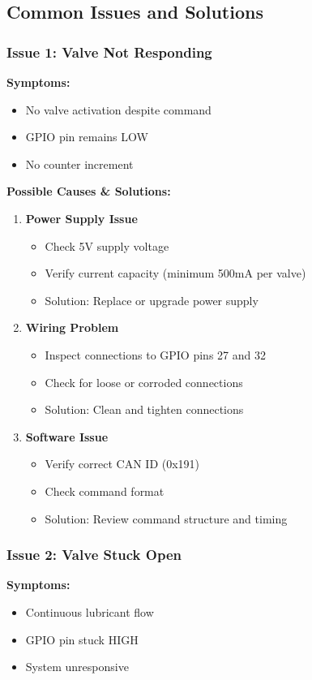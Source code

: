 \documentclass[11pt,a4paper]{article}
\begin{document}
\subsection{Common Issues and Solutions}

\subsubsection{Issue 1: Valve Not Responding}
\textbf{Symptoms:}
\begin{itemize}
    \item No valve activation despite command
    \item GPIO pin remains LOW
    \item No counter increment
\end{itemize}

\textbf{Possible Causes \& Solutions:}
\begin{enumerate}
    \item \textbf{Power Supply Issue}
    \begin{itemize}
        \item Check 5V supply voltage
        \item Verify current capacity (minimum 500mA per valve)
        \item Solution: Replace or upgrade power supply
    \end{itemize}
    
    \item \textbf{Wiring Problem}
    \begin{itemize}
        \item Inspect connections to GPIO pins 27 and 32
        \item Check for loose or corroded connections
        \item Solution: Clean and tighten connections
    \end{itemize}
    
    \item \textbf{Software Issue}
    \begin{itemize}
        \item Verify correct CAN ID (0x191)
        \item Check command format
        \item Solution: Review command structure and timing
    \end{itemize}
\end{enumerate}

\subsubsection{Issue 2: Valve Stuck Open}
\textbf{Symptoms:}
\begin{itemize}
    \item Continuous lubricant flow
    \item GPIO pin stuck HIGH
    \item System unresponsive
\end{itemize}
\end{document}
